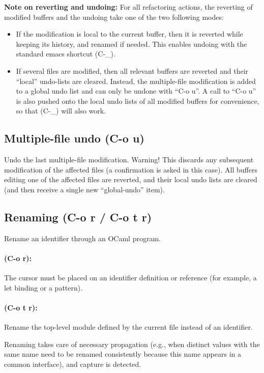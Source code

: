 {\bf Note on reverting and undoing:} For all refactoring actions, the
reverting of modified buffers and the undoing take one of the two
following modes:

\begin{itemize}
\item If the modification is local to the current buffer, then it is
  reverted while keeping its history, and renamed if needed. This
  enables undoing with the standard emacs shortcut (C-\_).
\item If several files are modified, then all relevant buffers are
  reverted and their ``local'' undo-lists are cleared. Instead, the
  multiple-file modification is added to a global undo list and can
  only be undone with ``C-o u''. A call to ``C-o u'' is also pushed
  onto the local undo lists of all modified buffers for convenience,
  so that (C-\_) will also work.
\end{itemize}

\subsection{Multiple-file undo (C-o u)}
Undo the last multiple-file modification. Warning! This discards any
subsequent modification of the affected files (a confirmation is asked
in this case). All buffers editing one of the affected files are
reverted, and their local undo lists are cleared (and then receive a
single new ``global-undo'' item).

\subsection{Renaming (C-o r / C-o t r)}
Rename an identifier through an OCaml program.

\paragraph{(C-o r):} The cursor must be placed on an identifier
definition or reference (for example, a let binding or a pattern).

\paragraph{(C-o t r):} Rename the top-level module defined by the
current file instead of an identifier.\\

\begin{htmlonly}
\smallskip
\end{htmlonly}
Renaming takes care of necessary propagation (e.g., when distinct
values with the same name need to be renamed consistently because this
name appears in a common interface), and capture is detected.

